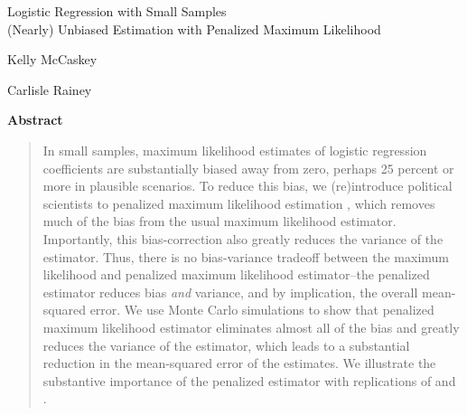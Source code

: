 \documentclass[12pt]{article}
\begin{document}
\begin{center}
{\LARGE Logistic Regression with Small Samples}\\\vspace{2mm}
{\large (Nearly) Unbiased Estimation with Penalized Maximum Likelihood}\\\vspace{2mm}

\vspace{10mm}

Kelly McCaskey

\vspace{3mm}

Carlisle Rainey
\end{center}

\vspace{10mm}

{\centerline{\textbf{Abstract}}}
\begin{quote}\noindent
In small samples, maximum likelihood estimates of logistic regression coefficients are substantially biased away from zero, perhaps 25 percent or more in plausible scenarios. 
To reduce this bias, we (re)introduce political scientists to penalized maximum likelihood estimation \citep{Firth1993}, which removes much of the bias from the usual maximum likelihood estimator. 
Importantly, this bias-correction also greatly reduces the variance of the estimator.
Thus, there is no bias-variance tradeoff between the maximum likelihood and penalized maximum likelihood estimator--the penalized estimator reduces bias \textit{and} variance, and by implication, the overall mean-squared error.
We use Monte Carlo simulations to show that penalized maximum likelihood estimator eliminates almost all of the bias and greatly reduces the variance of the estimator, which leads to a substantial reduction in the mean-squared error of the estimates.
We illustrate the substantive importance of the penalized estimator with replications of \cite{Weisiger2014} and \cite{GeorgeEpstein1992}.
 \end{quote}
\end{document}
